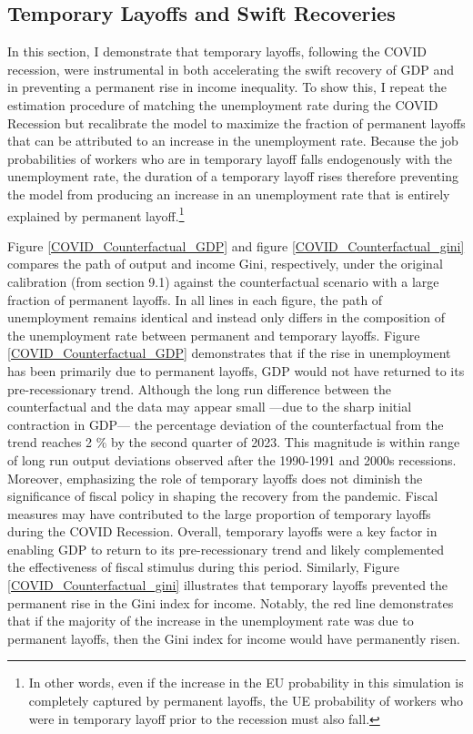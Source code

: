 \subsection{Temporary Layoffs and Swift Recoveries}


In this section, I demonstrate that temporary layoffs,  following the COVID recession,  were instrumental in both accelerating the swift recovery of GDP and in preventing a permanent rise in income inequality. To show this, I repeat the estimation procedure of matching the unemployment rate during the COVID Recession but recalibrate the model to maximize the fraction of permanent layoffs that can be attributed to an increase in the unemployment rate. Because the job probabilities of workers who are in temporary layoff falls endogenously with the unemployment rate, the duration of a temporary layoff rises therefore preventing the model from producing an increase in an unemployment rate that is entirely explained by permanent layoff.\footnote{In other words, even if the increase in the EU probability in this simulation is completely captured by permanent layoffs, the UE probability of workers who were in temporary layoff prior to the recession must also fall.}

Figure \ref{COVID_Counterfactual_GDP} and figure \ref{COVID_Counterfactual_gini} compares the path of output and income Gini, respectively, under the original calibration (from section 9.1) against the counterfactual scenario with a large fraction of permanent layoffs. In all lines in each figure, the path of unemployment remains identical and instead only differs in the composition of the unemployment rate between permanent and temporary layoffs. Figure \ref{COVID_Counterfactual_GDP} demonstrates that if the rise in unemployment has been primarily due to permanent layoffs, GDP would not have returned to its pre-recessionary trend. Although the long run difference between the counterfactual and the data may appear small ---due to the sharp initial contraction in GDP--- the percentage deviation of the counterfactual from the trend reaches 2 $\%$ by the second quarter of 2023. This magnitude is within range of long run output deviations observed after the 1990-1991 and 2000s recessions. Moreover, emphasizing the role of temporary layoffs does not diminish the significance of fiscal policy in shaping the recovery from the pandemic. Fiscal measures may have contributed to the large proportion of temporary layoffs during the COVID Recession. Overall, temporary layoffs were a key factor in enabling GDP to return to its pre-recessionary trend and likely complemented the effectiveness of fiscal stimulus during this period. Similarly, Figure \ref{COVID_Counterfactual_gini} illustrates that temporary layoffs prevented the permanent rise in the Gini index for income. Notably, the red line demonstrates that if the majority of the increase in the unemployment rate was due to permanent layoffs, then the Gini index for income would have permanently risen.  




